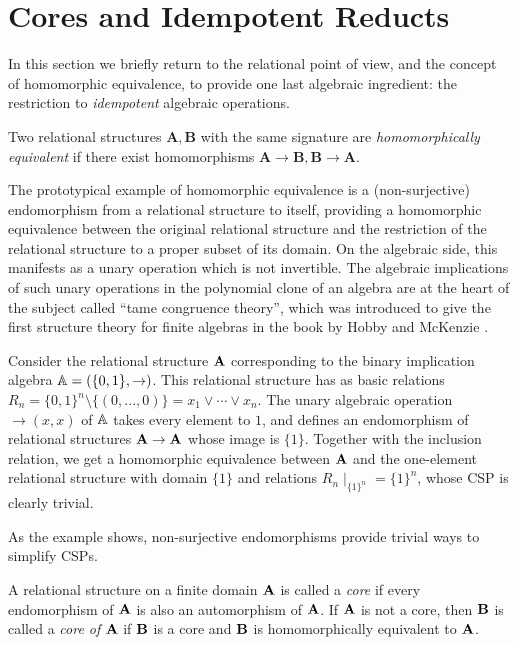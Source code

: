 \documentclass[letterpaper,11pt]{article}
\begin{document}
\section{Cores and Idempotent Reducts}

In this section we briefly return to the relational point of view, and the concept of homomorphic equivalence, to provide one last algebraic ingredient: the restriction to \emph{idempotent} algebraic operations.

\begin{defn} Two relational structures $\mathbf{A}, \mathbf{B}$ with the same signature are \emph{homomorphically equivalent} if there exist homomorphisms $\mathbf{A} \rightarrow \mathbf{B}, \mathbf{B} \rightarrow \mathbf{A}$.
\end{defn}

The prototypical example of homomorphic equivalence is a (non-surjective) endomorphism from a relational structure to itself, providing a homomorphic equivalence between the original relational structure and the restriction of the relational structure to a proper subset of its domain. On the algebraic side, this manifests as a unary operation which is not invertible. The algebraic implications of such unary operations in the polynomial clone of an algebra are at the heart of the subject called ``tame congruence theory'', which was introduced to give the first structure theory for finite algebras in the book by Hobby and McKenzie \cite{hobby-mckenzie}.

\begin{ex} Consider the relational structure $\mathbf{A}$ corresponding to the binary implication algebra $\mathbb{A} = (\{0,1\}, \to)$. This relational structure has as basic relations $R_n = \{0,1\}^n \setminus \{(0, ..., 0)\} = x_1 \vee \cdots \vee x_n$. The unary algebraic operation $\operatorname{\to}(x,x)$ of $\mathbb{A}$ takes every element to $1$, and defines an endomorphism of relational structures $\mathbf{A} \rightarrow \mathbf{A}$ whose image is $\{1\}$. Together with the inclusion relation, we get a homomorphic equivalence between $\mathbf{A}$ and the one-element relational structure with domain $\{1\}$ and relations $R_n \mid_{\{1\}^n} = \{1\}^n$, whose CSP is clearly trivial.
\end{ex}

As the example shows, non-surjective endomorphisms provide trivial ways to simplify CSPs.

\begin{defn} A relational structure on a finite domain $\mathbf{A}$ is called a \emph{core} if every endomorphism of $\mathbf{A}$ is also an automorphism of $\mathbf{A}$. If $\mathbf{A}$ is not a core, then $\mathbf{B}$ is called a \emph{core of} $\mathbf{A}$ if $\mathbf{B}$ is a core and $\mathbf{B}$ is homomorphically equivalent to $\mathbf{A}$.
\end{defn}
\end{document}

